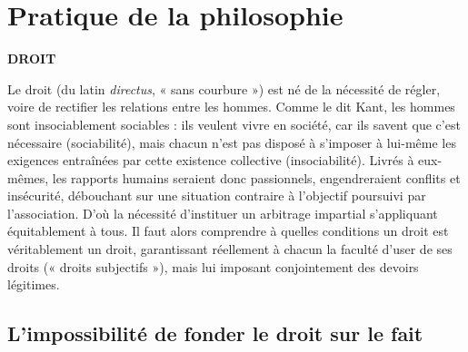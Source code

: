 
\section{Pratique de la philosophie}

{\bf DROIT}

\vspace{0.35cm}
%

Le droit (du latin {\it directus}, « sans courbure ») est né de la nécessité de régler,
voire de rectifier les relations entre les
hommes. Comme le dit Kant, les
hommes sont insociablement sociables :
ils veulent vivre en société, car ils savent
que c'est nécessaire (sociabilité), mais
chacun n'est pas disposé à s'imposer à
lui-même les exigences entraînées par
cette existence collective (insociabilité).
Livrés à eux-mêmes, les rapports
humains seraient donc passionnels,
engendreraient conflits et insécurité,
débouchant sur une situation contraire à
l'objectif poursuivi par l'association.
D'où la nécessité d’instituer un arbitrage
impartial s'appliquant équitablement à
tous. Il faut alors comprendre à quelles
conditions un droit est véritablement un
droit, garantissant réellement à chacun la
faculté d'user de ses droits (« droits subjectifs »), mais lui imposant conjointement des devoirs légitimes.

\subsection{L’impossibilité de fonder le droit
sur le fait}

